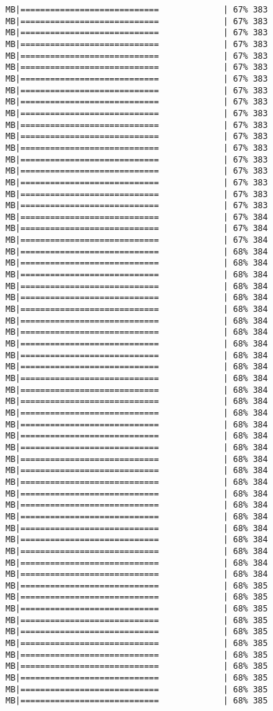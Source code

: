 \documentclass[
]{article}
\begin{document}
\begin{verbatim}
MB|============================             | 67% 383 MB|============================             | 67% 383 MB|============================             | 67% 383 MB|============================             | 67% 383 MB|============================             | 67% 383 MB|============================             | 67% 383 MB|============================             | 67% 383 MB|============================             | 67% 383 MB|============================             | 67% 383 MB|============================             | 67% 383 MB|============================             | 67% 383 MB|============================             | 67% 383 MB|============================             | 67% 383 MB|============================             | 67% 383 MB|============================             | 67% 383 MB|============================             | 67% 383 MB|============================             | 67% 383 MB|============================             | 67% 383 MB|============================             | 67% 384 MB|============================             | 67% 384 MB|============================             | 67% 384 MB|============================             | 68% 384 MB|============================             | 68% 384 MB|============================             | 68% 384 MB|============================             | 68% 384 MB|============================             | 68% 384 MB|============================             | 68% 384 MB|============================             | 68% 384 MB|============================             | 68% 384 MB|============================             | 68% 384 MB|============================             | 68% 384 MB|============================             | 68% 384 MB|============================             | 68% 384 MB|============================             | 68% 384 MB|============================             | 68% 384 MB|============================             | 68% 384 MB|============================             | 68% 384 MB|============================             | 68% 384 MB|============================             | 68% 384 MB|============================             | 68% 384 MB|============================             | 68% 384 MB|============================             | 68% 384 MB|============================             | 68% 384 MB|============================             | 68% 384 MB|============================             | 68% 384 MB|============================             | 68% 384 MB|============================             | 68% 384 MB|============================             | 68% 384 MB|============================             | 68% 384 MB|============================             | 68% 384 MB|============================             | 68% 385 MB|============================             | 68% 385 MB|============================             | 68% 385 MB|============================             | 68% 385 MB|============================             | 68% 385 MB|============================             | 68% 385 MB|============================             | 68% 385 MB|============================             | 68% 385 MB|============================             | 68% 385 MB|============================             | 68% 385 MB|============================             | 68% 385 
\end{verbatim}
\end{document}
